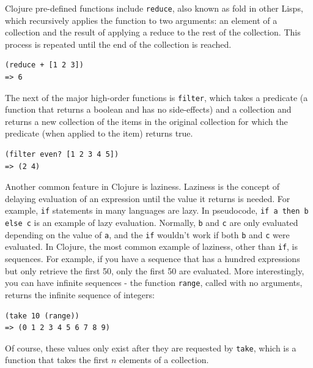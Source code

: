 \documentclass[12pt]{article}
\newcommand{\comment}[1]{{\bf \tt  {#1}}}
\newcommand{\emcomment}[1]{\textcolor{ForestGreen}{\comment{Elena: {#1}}}}
\newcommand{\clocode}[1]{{\texttt {#1}}}
\begin{document}
Clojure pre-defined functions include \clocode{reduce}, also known as fold in other Lisps, which recursively applies the function to two arguments: an element of a collection and the result of applying a reduce to the rest of the collection. This process is repeated until the end of the collection is reached. 
\begin{verbatim}
(reduce + [1 2 3])
=> 6
\end{verbatim}
The next of the major high-order functions is \clocode{filter}, which takes a predicate (a function that returns a boolean and has no side-effects) and a collection and returns a new collection of the items in the original collection for which the predicate (when applied to the item) returns true.
\begin{verbatim}
(filter even? [1 2 3 4 5])
=> (2 4)
\end{verbatim}
Another common feature in Clojure is laziness. Laziness is the concept of delaying evaluation of an expression until the value it returns is needed. For example, \clocode{if} statements in many languages are lazy. In pseudocode, \clocode{if a then b else c} is an example of lazy evaluation. Normally, \clocode{b} and \clocode{c} are only evaluated depending on the value of \clocode{a}, and the \clocode{if} wouldn't work if both \clocode{b} and \clocode{c} were evaluated. 
In Clojure, the most common example of laziness, other than \clocode{if}, is sequences. For example, if you have a sequence that has a hundred expressions but only retrieve the first 50, only the first 50 are evaluated. More interestingly, you can have infinite sequences - the function \clocode{range}, called with no arguments, returns the infinite sequence of integers:
\begin{verbatim}
(take 10 (range))
=> (0 1 2 3 4 5 6 7 8 9)
\end{verbatim}
Of course, these values only exist after they are requested by \clocode{take}, which is a function that takes the first $n$ elements of a collection. 
\end{document}

